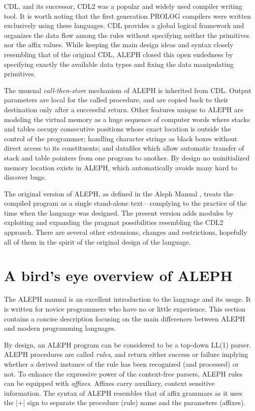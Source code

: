 \documentclass{article}
\newcommand\A{\textsf{ALEPH}}
\newcommand\g[1]{\textsf{#1}}
\begin{document}
\g{CDL}, and its successor, \g{CDL2} was a popular and widely used compiler
writing tool. It is worth noting that the first generation \g{PROLOG}
compilers were written exclusively using these languages. \g{CDL} provides a
global logical framework and organizes the data flow among the rules without
specifying neither the primitives nor the affix values. While keeping the
main design ideas and syntax closely resembling that of the original
\g{CDL}, \A{} closed this open endedness by specifying exactly the available
data types and fixing the data manipulating primitives.

The unusual \emph{call-then-store} mechanism of \A{} is inherited from
\g{CDL}. Output parameters are local for the called procedure, and are
copied back to their destination only after a successful return. Other
features unique to \A{} are modeling the virtual memory as a huge sequence of
computer words where stacks and tables occupy consecutive positions whose
exact location is outside the control of the programmer; handling character
strings as black boxes without direct access to its constituents; and
datafiles which allow automatic transfer of stack and table pointers from
one program to another. By design no uninitialized memory location exists
in \A, which automatically avoids many hard to discover bugs.

The original version of \A, as defined in the Aleph Manual \cite{A-manual},
treats the compiled program as a single stand-alone text---complying to the
practice of the time when the language was designed. The present version
adds modules by exploiting and expanding the \g{pragmat} possibilities
resembling the \g{CDL2} approach. There are several other extensions,
changes and restrictions, hopefully all of them in the spirit of the
original design of the language.


\section{A bird's eye overview of \A}\label{section:overview}

The \A{} manual \cite{A-manual} is an excellent introduction to the language
and its usage. It is written for novice programmers who have no or little
experience. This section contains a concise description focusing on the main
differences between \A{} and modern programming languages.

By design, an \A{} program can be considered to be a top-down \g{LL(1)}
parser. \A{} procedures are called \emph{rules}, and return either success
or failure implying whether a derived instance of the rule has been
recognized (and processed) or not. To enhance the expressive power of the
context-free parsers, \A{} rules can be equipped with \emph{affixes}.
Affixes carry auxiliary, context sensitive information. The syntax of \A{}
resembles that of affix grammars as it uses the \pp|+| sign to separate
the procedure (rule) name and the parameters (affixes).
\end{document}
